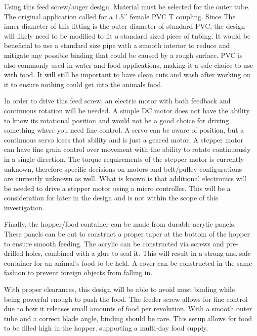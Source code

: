 \documentclass[12pt]{article}
\begin{document}
Using this feed screw/auger design. Material must be selected for the outer tube. The original application called for a 1.5’’ female PVC T coupling. Since The inner diameter of this fitting is the outer diameter of standard PVC, the design will likely need to be modified to fit a standard sized piece of tubing. It would be beneficial to use a standard size pipe with a smooth interior to reduce and mitigate any possible binding that could be caused by a rough surface. PVC is also commonly used in water and food applications, making it a safe choice to use with food. It will still be important to have clean cuts and wash after working on it to ensure nothing could get into the animals food. 

In order to drive this feed screw, an electric motor with both feedback and continuous rotation will be
needed. A simple DC motor does not have the ability to know its rotational position and would not be a good
choice for driving something where you need fine control. A servo can be aware of position, but a continuous
servo loses that ability and is just a geared motor. A stepper motor can have fine grain control over
movement with the ability to rotate continuously in a single direction. The torque requirements of the
stepper motor is currently unknown, therefore specific decisions on motors and belt/pulley configurations are
currently unknown as well. What is known is that additional electronics will be needed to drive a stepper
motor using a micro controller. This will be a consideration for later in the design and is not within the
scope of this investigation. 

Finally, the hopper/food container can be made from durable acrylic panels. These panels can be cut to construct a proper taper at the bottom of the hopper to ensure smooth feeding.  The acrylic can be constructed via screws and pre-drilled holes, combined with a glue to seal it. This will result in a strong and safe container for an animal’s food to be held. A cover can be constructed in the same fashion to prevent foreign objects from falling in. 

 With proper clearances, this design will be able to avoid most binding while being powerful enough to push the food. The feeder screw allows for fine control due to how it releases small amounts of food per revolution. With a smooth outer tube and a correct blade angle, binding should be rare. This setup allows for food to be filled high in the hopper, supporting a multi-day food supply. 

\end{document}
